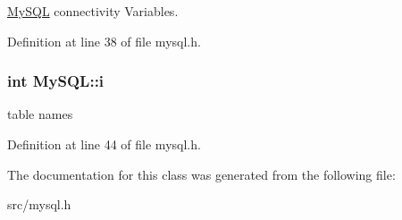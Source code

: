 \hyperlink{classMySQL}{My\-S\-Q\-L} connectivity Variables. 



Definition at line 38 of file mysql.\-h.

\hypertarget{classMySQL_ae461697dbdebb43334caa98e80bd5526}{
\subsubsection[{i}]{\setlength{\rightskip}{0pt plus 5cm}int My\-S\-Q\-L\-::i\hspace{0.3cm}{\ttfamily [protected]}}}\label{classMySQL_ae461697dbdebb43334caa98e80bd5526}


table names 



Definition at line 44 of file mysql.\-h.



The documentation for this class was generated from the following file\-:\begin{DoxyCompactItemize}
\item 
src/mysql.\-h\end{DoxyCompactItemize}
